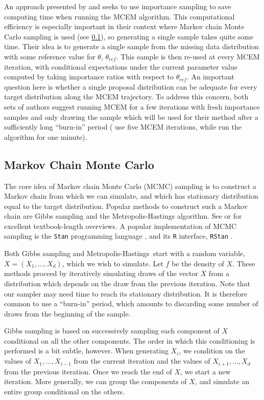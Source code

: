 \documentclass[11pt, oneside]{article}   	%
\newcommand{\mh}{Metropolis-Hastings}
\begin{document}
An approach presented by \citet{Qui99} and \citet{Lev01} seeks to use importance sampling to save computing time when running the MCEM algorithm. This computational efficiency is especially important in their context where Markov chain Monte Carlo sampling is used (see \ref{sec2:MCMC}), so generating a single sample takes quite some time. Their idea is to generate a single sample from the missing data distribution with some reference value for $\theta$, $\theta_{ref}$. This sample is then re-used at every MCEM iteration, with conditional expectations under the current parameter value computed by taking importance ratios with respect to $\theta_{ref}$. An important question here is whether a single proposal distribution can be adequate for every target distribution along the MCEM trajectory. To address this concern, both sets of authors suggest running MCEM for a few iterations with fresh importance samples and only drawing the sample which will be used for their method after a sufficiently long ``burn-in'' period (\citeauthor{Qui99} use five MCEM iterations, while \citeauthor{Lev01} run the algorithm for one minute). 


\subsection{Markov Chain Monte Carlo}
\label{sec2:MCMC}

The core idea of Markov chain Monte Carlo (MCMC) sampling is to construct a Markov chain from which we can simulate, and which has stationary distribution equal to the target distribution. Popular methods to construct such a Markov chain are Gibbs sampling and the Metropolis-Hastings algorithm. See \citet{Gel13} or \citet{Rob04} for excellent textbook-length overviews. A popular implementation of MCMC sampling is the \texttt{Stan} programming language \citep{Sta22}, and its \texttt{R} interface, \texttt{RStan} \citep{Sta23}.

Both Gibbs sampling and \mh\ start with a random variable, $X = (X_1, \ldots, X_d)$, which we wish to simulate. Let $f$ be the density of $X$. These methods proceed by iteratively simulating draws of the vector $X$ from a distribution which depends on the draw from the previous iteration. Note that our sampler may need time to reach its stationary distribution. It is therefore common to use a ``burn-in'' period, which amounts to discarding some number of draws from the beginning of the sample.

Gibbs sampling is based on successively sampling each component of $X$ conditional on all the other components. The order in which this conditioning is performed is a bit subtle, however. When generating $X_i$, we condition on the values of $X_1,\ldots, X_{i-1}$ from the current iteration and the values of $X_{i+1}, \ldots, X_d$ from the previous iteration. Once we reach the end of $X$, we start a new iteration.  More generally, we can group the components of $X$, and simulate an entire group conditional on the others.
\end{document}
